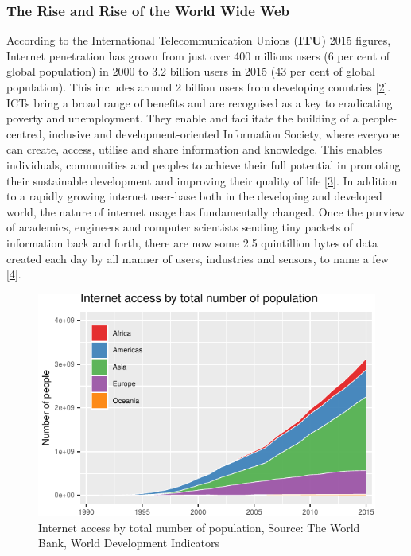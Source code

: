 \documentclass[11pt,]{article}
\begin{document}
\hypertarget{the-rise-and-rise-of-the-world-wide-web}{%
\subsubsection{The Rise and Rise of the World Wide
Web}\label{the-rise-and-rise-of-the-world-wide-web}}

According to the International Telecommunication Unions (\textbf{ITU})
2015 figures, Internet penetration has grown from just over 400 millions
users (6 per cent of global population) in 2000 to 3.2 billion users in
2015 (43 per cent of global population). This includes around 2 billion
users from developing countries
{[}\protect\hyperlink{ref-duttaGlobalInformationTechnology2015}{2}{]}.
ICTs bring a broad range of benefits and are recognised as a key to
eradicating poverty and unemployment. They enable and facilitate the
building of a people-centred, inclusive and development-oriented
Information Society, where everyone can create, access, utilise and
share information and knowledge. This enables individuals, communities
and peoples to achieve their full potential in promoting their
sustainable development and improving their quality of life
{[}\protect\hyperlink{ref-InformationCommunicationTechnologies}{3}{]}.
In addition to a rapidly growing internet user-base both in the
developing and developed world, the nature of internet usage has
fundamentally changed. Once the purview of academics, engineers and
computer scientists sending tiny packets of information back and forth,
there are now some 2.5 quintillion bytes of data created each day by all
manner of users, industries and sensors, to name a few
{[}\protect\hyperlink{ref-DataNeverSleeps}{4}{]}.

\begin{figure}[H]

{\centering \includegraphics{MD_Final_files/figure-latex/internetAccessPlot-1} 

}

\caption{Internet access by total number of population, Source: The World Bank, World Development Indicators}\label{fig:internetAccessPlot}
\end{figure}
\end{document}
